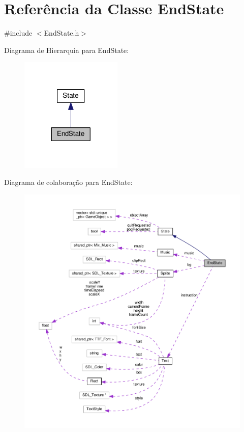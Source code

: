 \hypertarget{classEndState}{\section{Referência da Classe End\+State}
\label{classEndState}
}


{\ttfamily \#include $<$End\+State.\+h$>$}



Diagrama de Hierarquia para End\+State\+:\nopagebreak
\begin{figure}[H]
\begin{center}
\leavevmode
\includegraphics[width=137pt]{classEndState__inherit__graph}
\end{center}
\end{figure}


Diagrama de colaboração para End\+State\+:
\nopagebreak
\begin{figure}[H]
\begin{center}
\leavevmode
\includegraphics[width=350pt]{classEndState__coll__graph}
\end{center}
\end{figure}
